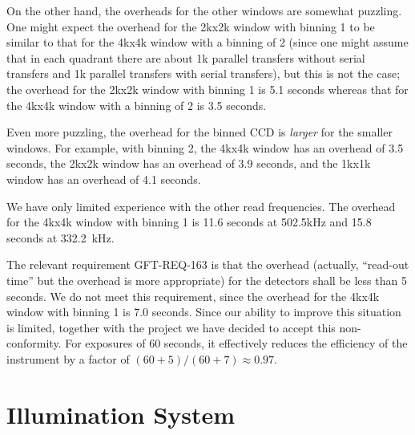 \documentclass{article}
\newcommand{\code}[1]{{\ttfamily #1}}
\begin{document}
On the other hand, the overheads for the other windows are somewhat puzzling. One might expect the overhead for the \code{2kx2k} window with binning 1 to be similar to that for the \code{4kx4k} window with a binning of 2 (since one might assume that in each quadrant there are about 1k parallel transfers without serial transfers and 1k parallel transfers with serial transfers), but this is not the case; the overhead for the \code{2kx2k} window with binning 1 is 5.1 seconds whereas that for the \code{4kx4k} window with a binning of 2 is 3.5 seconds.

Even more puzzling, the overhead for the binned CCD is \emph{larger} for the smaller windows. For example, with binning 2, the \code{4kx4k} window has an overhead of 3.5 seconds, the \code{2kx2k} window has an overhead of 3.9 seconds, and the \code{1kx1k} window has an overhead of 4.1 seconds.

We have only limited experience with the other read frequencies. The overhead for the \code{4kx4k} window with binning 1 is 11.6 seconds at 502.5kHz and 15.8 seconds at 332.2~kHz.

The relevant requirement GFT-REQ-163 is that the overhead (actually, “read-out time” but the overhead is more appropriate) for the detectors shall be less than 5 seconds. We do not meet this requirement, since the overhead for the \code{4kx4k} window with binning 1 is 7.0 seconds. Since our ability to improve this situation is limited, together with the project we have decided to accept this non-conformity. For exposures of 60 seconds, it effectively reduces the efficiency of the instrument by a factor of $(60+5)/(60+7) \approx 0.97$.

\section{Illumination System}
\end{document}
